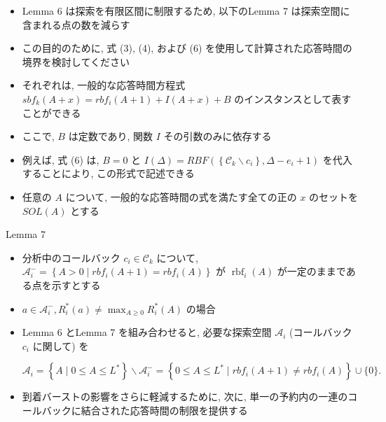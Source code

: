 \begin{frame}{}
    \begin{itemize}
        \item Lemma 6 は探索を有限区間に制限するため, 以下のLemma 7 は探索空間に含まれる点の数を減らす
        \item この目的のために, 式 (3), (4), および (6) を使用して計算された応答時間の境界を検討してください
        \item それぞれは, 一般的な応答時間方程式 $s b f_{k}(A+x)=r b f_{i}(A+1)+I(A+x)+B$ のインスタンスとして表すことができる
        \item ここで, $B$ は定数であり, 関数 $I$ その引数のみに依存する
        \item 例えば, 式 (6) は, $B=0$ と $I(\Delta)=R B F\left(\left\{\mathcal{C}_{k} \backslash c_{i}\right\}, \Delta-e_{i}+1\right)$ を代入することにより, この形式で記述できる
        \item 任意の $A$ について, 一般的な応答時間の式を満たす全ての正の $x$ のセットを $S O L(A)$ とする
    \end{itemize}
\end{frame}

\begin{frame}[label=lemma7]{Lemma 7}
    \begin{lemma}[]
        \begin{itemize}
            \item 分析中のコールバック $c_{i} \in \mathcal{C}_{k}$ について, $\mathcal{A}_{i}^{-}=\left\{A>0 \mid r b f_{i}(A+1)=r b f_{i}(A)\right\}$ が $\operatorname{rbf}_{i}(A)$ が一定のままである点を示すとする
            \item $a \in \mathcal{A}_{i}^{-}, R_{i}^{*}(a) \neq \max _{A \geq 0} R_{i}^{*}(A)$ の場合
        \end{itemize}
    \end{lemma}
\end{frame}

\begin{frame}{}
    \begin{itemize}
        \item Lemma 6 とLemma 7 を組み合わせると, 必要な探索空間 $\mathcal{A}_{i}$ (コールバック $c_{i}$ に関して) を

              \begin{equation*}
                  \mathcal{A}_{i}=\left\{A \mid 0 \leq A \leq L^{*}\right\} \backslash \mathcal{A}_{i}^{-}=\left\{0 \leq A \leq L^{*} \mid r b f_{i}(A+1) \neq r b f_{i}(A)\right\} \cup\{0\} .
              \end{equation*}

        \item 到着バーストの影響をさらに軽減するために, 次に, 単一の予約内の一連のコールバックに結合された応答時間の制限を提供する
    \end{itemize}
\end{frame}


